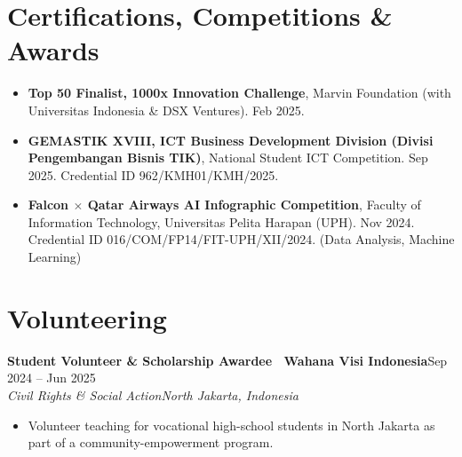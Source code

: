 \documentclass[a4paper,11pt]{article}
\newcommand{\entry}[4]{%
  \vspace{7pt}
  {\bfseries #1}\hfill{\normalsize #2}\\[2pt]
  {\itshape #3}\hfill{\itshape\small #4}\\[1pt]
}
\begin{document}
\section{Certifications, Competitions \& Awards}
\begin{itemize}
  \item \textbf{Top 50 Finalist, 1000x Innovation Challenge}, Marvin Foundation (with Universitas Indonesia \& DSX Ventures). Feb 2025.
  \item \textbf{GEMASTIK XVIII, ICT Business Development Division (Divisi Pengembangan Bisnis TIK)}, National Student ICT Competition. Sep 2025. Credential ID 962/KMH01/KMH/2025.
  \item \textbf{Falcon $\times$ Qatar Airways AI Infographic Competition}, Faculty of Information Technology, Universitas Pelita Harapan (UPH). Nov 2024. Credential ID 016/COM/FP14/FIT-UPH/XII/2024. (Data Analysis, Machine Learning)
\end{itemize}

\section{Volunteering}
\entry{Student Volunteer \& Scholarship Awardee \textbar\ Wahana Visi Indonesia}{Sep 2024 -- Jun 2025}{Civil Rights \& Social Action}{North Jakarta, Indonesia}
\begin{itemize}
  \item Volunteer teaching for vocational high-school students in North Jakarta as part of a community-empowerment program.
\end{itemize}
\end{document}
